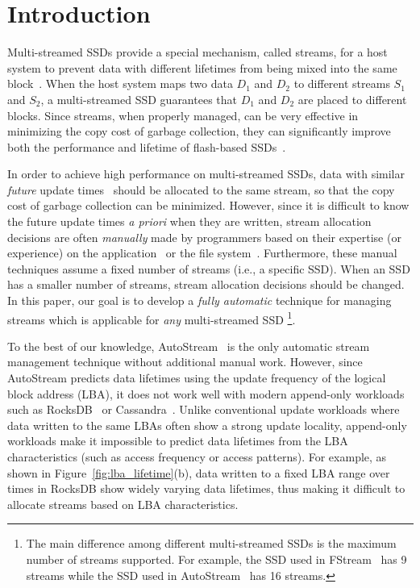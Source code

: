 \section{Introduction}
\label{sec:intro}
Multi-streamed SSDs provide a special mechanism,
called streams, for a host system to prevent data with different lifetimes 
from being mixed into the same block~\cite{T10, MultiStream}.
When the host system maps two data $D_1$ and $D_2$ to 
different streams $S_1$ and $S_2$, a multi-streamed SSD guarantees that 
$D_1$ and $D_2$ are placed to different blocks.   
Since streams, when properly managed, can be very effective in minimizing 
the copy cost of garbage collection, they
can significantly improve both the performance and lifetime of 
flash-based SSDs~\cite{MultiStream, FStream, AutoStream, Level}.

In order to achieve high performance on multi-streamed SSDs, data with similar 
{\it future} update times~\cite{PCHa}
should be allocated 
to the same stream, so that the copy cost of garbage collection can be minimized.
However, since it is difficult to know the future update times {\it a priori} when they are written,
stream allocation decisions are often {\it manually} made by programmers based on their expertise (or experience) 
on the application~\cite{MultiStream} or the file system~\cite{FStream}.  
Furthermore, these manual techniques assume a fixed number of 
streams (i.e., a specific SSD).   
When an SSD has a smaller number of streams, stream allocation decisions should be changed.
In this paper, our goal is to develop 
a {\it fully automatic} technique for managing streams 
which is applicable for {\it any} multi-streamed SSD
\footnote{The main difference among different multi-streamed 
SSDs is the maximum number of streams supported.  
For example, the SSD used in FStream~\cite{FStream} has 9 streams 
while the SSD used in AutoStream~\cite{AutoStream} has 16 streams.}.

To the best of our knowledge, AutoStream~\cite{AutoStream} is the only automatic 
stream management technique
without additional manual work.  
However, since AutoStream predicts data lifetimes using the update frequency 
of the logical block address (LBA), it does not work well with modern append-only workloads 
such as RocksDB~\cite{RocksDB} or Cassandra~\cite{Cassandra}.  
Unlike conventional update workloads where data written to the same LBAs 
often show a strong update locality, 
append-only workloads make it impossible to predict data lifetimes 
from the LBA characteristics (such as access frequency or access patterns).  
For example, as shown in Figure~\ref{fig:lba_lifetime}(b), 
data written to a fixed LBA range over times in RocksDB 
show widely varying data lifetimes, 
thus making it difficult to allocate streams based on LBA characteristics.


